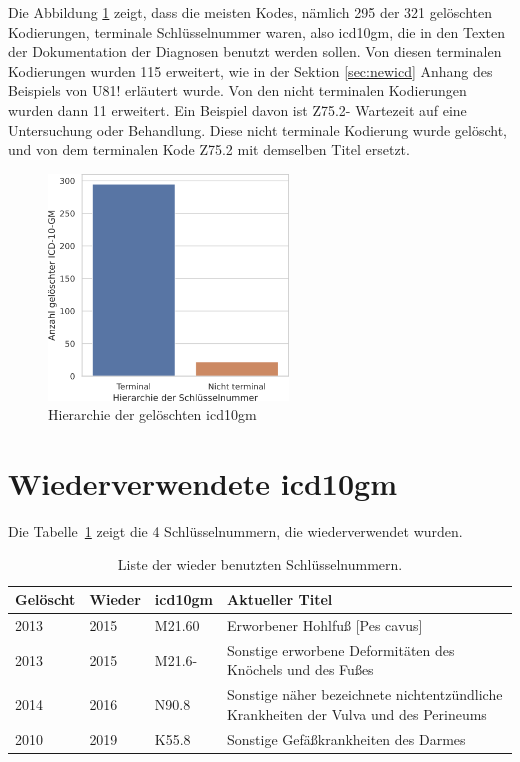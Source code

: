Die Abbildung \ref{fig:oldicdort} zeigt, dass die meisten Kodes, nämlich 295 der 321 gelöschten Kodierungen, terminale Schlüsselnummer waren, also \ac{icd10gm}, die in den Texten der Dokumentation der Diagnosen benutzt werden sollen. Von diesen terminalen Kodierungen wurden 115 erweitert, wie in der Sektion \ref{sec:newicd} Anhang des Beispiels von \textsf{U81!} erläutert wurde. Von den nicht terminalen Kodierungen wurden dann 11 erweitert. Ein Beispiel davon ist \textsf{Z75.2-} \textsf{Wartezeit auf eine Untersuchung oder Behandlung}. Diese nicht terminale Kodierung wurde gelöscht, und von dem terminalen Kode \textsf{Z75.2} mit demselben Titel ersetzt. 


\begin{figure}[ht]
	\centering
	\includegraphics[height=6cm]{figures/ortoldYear}
	\caption{Hierarchie der gelöschten \acs{icd10gm}}
	\label{fig:oldicdort}
\end{figure}


\section{Wiederverwendete \acs{icd10gm}} \label{sec:delinicd}

Die Tabelle~\ref{tab:wieder} zeigt die 4 Schlüsselnummern, die wiederverwendet wurden.

\begin{table}[ht]
	\centering
	\small
	\caption[Wieder benutzte \acs{icd10gm}]{Liste der wieder benutzten Schlüsselnummern.}
	\label{tab:wieder}
	\begin{tabular}{|l|l|l|p{6cm}|}
		\hline
		\rowcolor{lightgray} Gelöscht & Wieder & \ac{icd10gm} & Aktueller Titel \\ \hline
		2013 & 2015 & M21.60 & Erworbener Hohlfuß [Pes cavus] \\ \hline
		2013 & 2015 & M21.6- & Sonstige erworbene Deformitäten des Knöchels und des Fußes \\ \hline
		2014 & 2016 & N90.8 & Sonstige näher bezeichnete nichtentzündliche Krankheiten der Vulva und des Perineums \\ \hline
		2010 & 2019 & K55.8 & Sonstige Gefäßkrankheiten des Darmes \\ \hline

\end{tabular}
\end{table}

